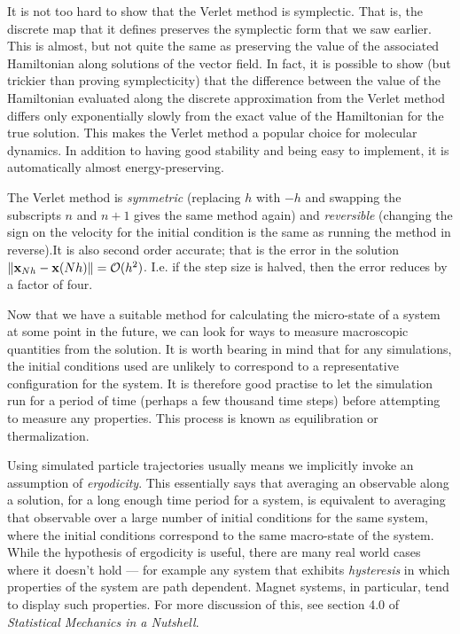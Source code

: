 \documentclass{article}
\begin{document}
It is not too hard to show that the Verlet method is symplectic. That is, the discrete map that it defines preserves the symplectic form that we saw earlier. This is almost, but not quite the same as preserving the value of the associated Hamiltonian along solutions of the vector field. In fact, it is possible to show (but trickier than proving symplecticity) that the difference between the value of the Hamiltonian evaluated along the discrete approximation from the Verlet method differs only exponentially slowly from the exact value of the Hamiltonian for the true solution. This makes the Verlet method a popular choice for molecular dynamics. In addition to having good stability and being easy to implement, it is automatically almost energy-preserving.

The Verlet method is \emph{symmetric} (replacing $h$ with $-h$ and swapping the subscripts $n$ and $n+1$ gives the same method again) and \emph{reversible} (changing the sign on the velocity for the initial condition is the same as running the method in reverse).It is also second order accurate; that is the error in the solution $\|{\bf x}_{Nh}-{\bf x}(Nh)\|=\mathcal{O}(h^2)$. I.e. if the step size is halved, then the error reduces by a factor of four.

Now that we have a suitable method for calculating the micro-state of a system at some point in the future, we can look for ways to measure macroscopic quantities from the solution. It is worth bearing in mind that for any simulations, the initial conditions used are unlikely to correspond to a representative configuration for the system. It is therefore good practise to let the simulation run for a period of time (perhaps a few thousand time steps) before attempting to measure any properties. This process is known as equilibration or thermalization.

Using simulated particle trajectories usually means we implicitly invoke an assumption of \emph{ergodicity}. This essentially says that averaging an observable along a solution, for a long enough time period for a system, is equivalent to averaging that observable over a large number of initial conditions for the same system, where the initial conditions correspond to the same macro-state of the system. While the hypothesis of ergodicity is useful, there are many real world cases where it doesn't hold --- for example any system that exhibits \emph{hysteresis} in which properties of the system are path dependent. Magnet systems, in particular, tend to display such properties. For more discussion of this, see section 4.0 of \emph{Statistical Mechanics in a Nutshell}. 
\end{document}
